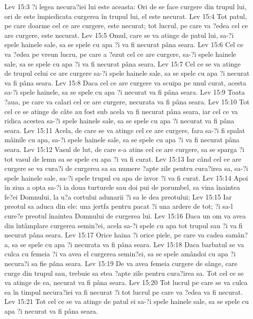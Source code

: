 Lev 15:3  ?i legea necura?iei lui este aceasta: Ori de se face curgere din trupul lui, ori de este împiedicata curgerea în trupul lui, el este necurat.
Lev 15:4  Tot patul, pe care doarme cel ce are curgere, este necurat; tot lucrul, pe care va ?edea cel ce are curgere, este necurat.
Lev 15:5  Omul, care se va atinge de patul lui, sa-?i spele hainele sale, sa se spele cu apa ?i va fi necurat pâna seara.
Lev 15:6  Cel ce va ?edea pe vreun lucru, pe care a ?ezut cel ce are curgere, sa-?i spele hainele sale, sa se spele cu apa ?i va fi necurat pâna seara.
Lev 15:7  Cel ce se va atinge de trupul celui ce are curgere sa-?i spele hainele sale, sa se spele cu apa ?i necurat va fi pâna seara.
Lev 15:8  Daca cel ce are curgere va scuipa pe unul curat, acesta sa-?i spele hainele, sa se spele cu apa ?i necurat va fi pâna seara.
Lev 15:9  Toata ?aua, pe care va calari cel ce are curgere, necurata va fi pâna seara.
Lev 15:10  Tot cel ce se atinge de câte au fost sub acela va fi necurat pâna seara, iar cel ce va ridica acestea sa-?i spele hainele sale, sa se spele cu apa ?i necurat va fi pâna seara.
Lev 15:11  Acela, de care se va atinge cel ce are curgere, fara sa-?i fi spalat mâinile cu apa, sa-?i spele hainele sale, sa se spele cu apa ?i va fi necurat pâna seara.
Lev 15:12  Vasul de lut, de care s-a atins cel ce are curgere, sa se sparga ?i tot vasul de lemn sa se spele cu apa ?i va fi curat.
Lev 15:13  Iar când cel ce are curgere se va cura?i de curgerea sa sa numere ?apte zile pentru cura?irea sa, sa-?i spele hainele sale, sa-?i spele trupul cu apa de izvor ?i va fi curat.
Lev 15:14  Apoi în ziua a opta sa-?i ia doua turturele sau doi pui de porumbel, sa vina înaintea fe?ei Domnului, la u?a cortului adunarii ?i sa le dea preotului;
Lev 15:15  Iar preotul sa aduca din ele: una jertfa pentru pacat ?i una ardere de tot; ?i sa-l cure?e preotul înaintea Domnului de curgerea lui.
Lev 15:16  Daca un om va avea din întâmplare curgerea semin?ei, acela sa-?i spele cu apa tot trupul sau ?i va fi necurat pâna seara.
Lev 15:17  Orice haina ?i orice piele, pe care va cadea samân?a, sa se spele cu apa ?i necurata va fi pâna seara.
Lev 15:18  Daca barbatul se va culca cu femeia ?i va avea el curgerea semin?ei, sa se spele amândoi cu apa ?i necura?i sa fie pâna seara.
Lev 15:19  De va avea femeia curgere de sânge, care curge din trupul sau, trebuie sa stea ?apte zile pentru cura?irea sa. Tot cel ce se va atinge de ea, necurat va fi pâna seara.
Lev 15:20  Tot lucrul pe care se va culca ea în timpul necura?iei va fi necurat ?i tot lucrul pe care va ?edea va fi necurat.
Lev 15:21  Tot cel ce se va atinge de patul ei sa-?i spele hainele sale, sa se spele cu apa ?i necurat va fi pâna seara.
